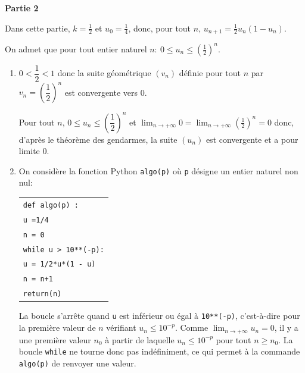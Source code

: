 \documentclass[10pt]{article}
\providecommand{\ds}{\displaystyle}
\begin{document}
\bigskip

\textbf{Partie 2}

\medskip

 Dans cette partie, $k= \frac12$  et $u_0 = \frac14$, donc, pour tout $n$,\: $u_{n+1} = \frac12 u_n \left(1 - u_n\right)$.

On admet que pour tout entier naturel $n :\: 0 \leqslant u_n \leqslant \left(\frac12\right)^n$.



\begin{enumerate}
\item 
$0<\dfrac{1}{2}<1$ donc la suite géométrique $(v_n)$ définie pour tout $n$ par $v_n=\left (\dfrac{1}{2} \right )^n$ est convergente vers 0.

Pour tout $n$, $ 0 \leqslant u_n \leqslant \left(\dfrac12\right)^n$ et $\ds\lim_{n\to +\infty} 0 = \ds\lim_{n\to +\infty} \left (\frac{1}{2}\right )^n=0$ donc, d'après le théorème des gendarmes, la suite $(u_n)$ est convergente et a pour limite 0.

\item On considère la fonction Python \texttt{algo(p)} où \texttt{p} désigne un entier naturel non nul:

\begin{center}
\begin{tabular}{|l|}\hline
\texttt{def algo(p) :}\\
\quad  \texttt{u =1/4}\\
\quad \texttt{n = 0}\\
\quad \texttt{while u > 10**(-p):}\\
\quad \qquad \texttt{u = 1/2*u*(1 - u)}\\
\quad \qquad \texttt{n = n+1}\\
\quad \texttt{return(n)}\\ \hline
\end{tabular}
\end{center}

La boucle s'arrête quand \texttt{u} est inférieur ou égal à \texttt{10**(-p)}, c'est-à-dire pour la première valeur de $n$ vérifiant $u_n \leqslant 10^{-p}$.
Comme $\ds\lim_{n\to +\infty} u_n=0$, il y a une première valeur $n_0$ à partir de laquelle $u_n \leqslant 10^{-p}$ pour tout $n\geqslant n_0$.
La boucle \texttt{while} ne tourne donc pas indéfiniment, ce qui permet à la commande \texttt{algo(p)} de renvoyer une valeur.
\end{enumerate}

\bigskip
\end{document}
